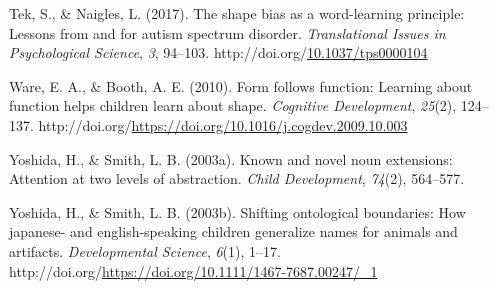 \documentclass[10pt, letterpaper]{article}
\newenvironment{CSLReferences}%
  {}%
  {\par}
\begin{document}
\begin{CSLReferences}{1}{0}
\leavevmode{}%
Tek, S., \& Naigles, L. (2017). The shape bias as a word-learning
principle: Lessons from and for autism spectrum disorder.
\emph{Translational Issues in Psychological Science}, \emph{3}, 94--103.
http://doi.org/\href{https://doi.org/10.1037/tps0000104}{10.1037/tps0000104}

\leavevmode{}%
Ware, E. A., \& Booth, A. E. (2010). Form follows function: Learning
about function helps children learn about shape. \emph{Cognitive
Development}, \emph{25}(2), 124--137.
http://doi.org/\url{https://doi.org/10.1016/j.cogdev.2009.10.003}

\leavevmode{}%
Yoshida, H., \& Smith, L. B. (2003a). Known and novel noun extensions:
Attention at two levels of abstraction. \emph{Child Development},
\emph{74}(2), 564--577.

\leavevmode{}%
Yoshida, H., \& Smith, L. B. (2003b). Shifting ontological boundaries:
How japanese- and english-speaking children generalize names for animals
and artifacts. \emph{Developmental Science}, \emph{6}(1), 1--17.
http://doi.org/\url{https://doi.org/10.1111/1467-7687.00247/_1}

\end{CSLReferences}


\end{document}
